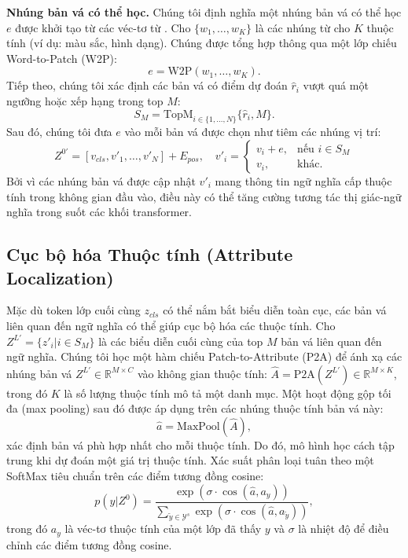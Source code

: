 \textbf{Nhúng bản vá có thể học.} Chúng tôi định nghĩa một nhúng bản vá có thể học $e$ được khởi tạo từ các véc-tơ từ \cite{39}. Cho $\{w_1, \dots, w_K\}$ là các nhúng từ cho $K$ thuộc tính (ví dụ: màu sắc, hình dạng). Chúng được tổng hợp thông qua một lớp chiếu Word-to-Patch (W2P):
\begin{equation}
e = \text{W2P}(w_1, \dots, w_K).
\end{equation}
Tiếp theo, chúng tôi xác định các bản vá có điểm dự đoán $\hat{r}_i$ vượt quá một ngưỡng hoặc xếp hạng trong top $M$:
\begin{equation}
S_M = \text{TopM}_{i \in \{1, \dots, N\}} \{\hat{r}_i, M\}.
\end{equation}
Sau đó, chúng tôi đưa $e$ vào mỗi bản vá được chọn như tiêm các nhúng vị trí:
\begin{equation}
Z^{0'} = [v_{cls}, v'_1, \dots, v'_N] + E_{pos}, \quad v'_i = 
\begin{cases}
    v_i + e, & \text{nếu } i \in S_M \\
    v_i, & \text{khác}.
\end{cases}
\end{equation}
Bởi vì các nhúng bản vá được cập nhật $v'_i$ mang thông tin ngữ nghĩa cấp thuộc tính trong không gian đầu vào, điều này có thể tăng cường tương tác thị giác-ngữ nghĩa trong suốt các khối transformer.

\subsection{Cục bộ hóa Thuộc tính (Attribute Localization)}
Mặc dù token lớp cuối cùng $z_{cls}$ có thể nắm bắt biểu diễn toàn cục, các bản vá liên quan đến ngữ nghĩa có thể giúp cục bộ hóa các thuộc tính. Cho $Z^{L'} = \{z'_i | i \in S_M\}$ là các biểu diễn cuối cùng của top $M$ bản vá liên quan đến ngữ nghĩa. Chúng tôi học một hàm chiếu Patch-to-Attribute (P2A) để ánh xạ các nhúng bản vá $Z^{L'} \in \mathbb{R}^{M \times C}$ vào không gian thuộc tính: $\hat{A} = \text{P2A}(Z^{L'}) \in \mathbb{R}^{M \times K}$, trong đó $K$ là số lượng thuộc tính mô tả một danh mục. Một hoạt động gộp tối đa (max pooling) sau đó được áp dụng trên các nhúng thuộc tính bản vá này:
\begin{equation}
\hat{a} = \text{MaxPool}(\hat{A}),
\end{equation}
xác định bản vá phù hợp nhất cho mỗi thuộc tính. Do đó, mô hình học cách tập trung khi dự đoán một giá trị thuộc tính. Xác suất phân loại tuân theo một SoftMax tiêu chuẩn trên các điểm tương đồng cosine:
\begin{equation}
p(y|Z^0) = \frac{\exp(\sigma \cdot \cos(\hat{a}, a_y))}{\sum_{\tilde{y} \in \mathcal{Y}^s} \exp(\sigma \cdot \cos(\hat{a}, a_{\tilde{y}}))},
\end{equation}
trong đó $a_y$ là véc-tơ thuộc tính của một lớp đã thấy $y$ và $\sigma$ là nhiệt độ để điều chỉnh các điểm tương đồng cosine.

